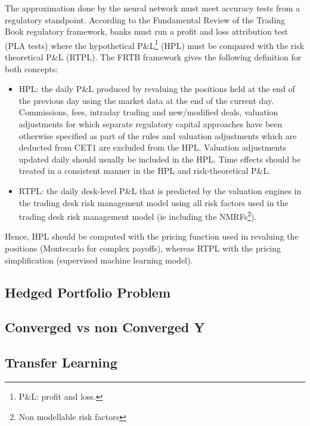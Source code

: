 The approximation done by the neural network must meet accuracy tests from a regulatory standpoint. According to the Fundamental Review of the Trading Book \cite{FRTB} regulatory framework, banks must run a profit and loss attribution test (PLA tests) where the hypothetical P\&L\footnote{P\&L: profit and loss.} (HPL) must be compared with the risk theoretical P\&L (RTPL). The FRTB framework gives the following definition for both concepts:

\begin{itemize}
    \item HPL:  the daily P\&L produced by revaluing the positions held at the end of the
previous day using the market data at the end of the current day. Commissions, fees, intraday
trading and new/modified deals, valuation adjustments for which separate regulatory capital
approaches have been otherwise specified as part of the rules and valuation adjustments which
are deducted from CET1 are excluded from the HPL. Valuation adjustments updated daily should
usually be included in the HPL. Time effects should be treated in a consistent manner in the HPL
and risk-theoretical P\&L.
\item RTPL: the daily desk-level P&L that is predicted by the valuation engines
in the trading desk risk management model using all risk factors used in the trading desk risk
management model (ie including the NMRFs\footnote{Non modellable risk factors}).
\end{itemize}

Hence, HPL should be computed with the pricing function used in revaluing the positions (Montecarlo for complex payoffs), whereas RTPL with the pricing simplification (supervised machine learning model). 



\subsection{Hedged Portfolio Problem}
\subsection{Converged vs non Converged Y}
\subsection{Transfer Learning}





